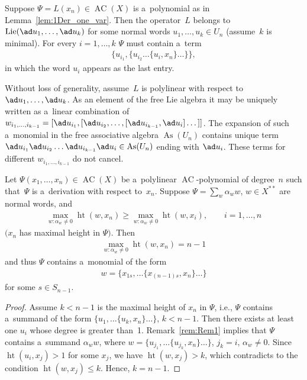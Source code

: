 \begin{remark}
\label{rem:Rem1}
Suppose $\Psi=L(x_n)\in \operatorname{AC}(X) $ is a~polynomial as in Lemma~\ref{lem:1Der_one_var}.
Then the operator~$L$ belongs to $\operatorname{Lie}(\ad u_1,\dots, \ad u_k)$ for some normal words $u_1,\dots, u_k
\in U_n$ (assume~$k$ is minimal).
For every $i=1,\dots, k$ $\Psi $ must contain a~term
\begin{gather*}
\{u_{i_1},\{u_{i_2} \dots\{u_{i},x_n\}\dots \}\},
\end{gather*}
in which the word $u_i$ appears as the last entry.
\end{remark}

Without loss of generality, assume~$L$ is polylinear with respect to $\ad u_1, \dots, \ad u_k$.
As an element of the free Lie algebra it may be uniquely written as a~linear combination of $w_{i_1,\dots, i_{k-1}} =
[\ad u_{i_1}, [\ad u_{i_2}, \dots, [\ad u_{i_{k-1}}, \ad u_i]\dots]]$.
The expansion of such a~monomial in the free associative algebra $\operatorname{As}(U_n)$ contains unique term $\ad u_{i_1}
\ad u_{i_2} \dots \ad u_{i_{k-1}} \ad u_i\in \operatorname{As}(U_n)$ ending with $\ad u_i$.
These terms for dif\/ferent $w_{i_1,\dots, i_{k-1}}$ do not cancel.

\begin{corollary}
\label{cor:ACformDer}
Let $\Psi(x_1,\dots, x_n) \in \operatorname{AC}(X)$ be a~polylinear $\operatorname{AC}$-poly\-no\-mi\-al of degree~$n$ such that~$\Psi $ is a~derivation
with respect to~$x_n$.
Suppose $\Psi = \sum\limits_{w} \alpha_w w$, $w\in X^{**}$ are normal words, and
\begin{gather*}
\max\limits_{w:\alpha_w\ne 0} \operatorname{ht}(w,x_n)\ge \max\limits_{w:\alpha_w\ne 0} \operatorname{ht}(w,x_i),
\qquad
i=1,\dots, n
\end{gather*}
$(x_n$ has maximal height in $\Psi)$.
Then
\begin{gather*}
\max\limits_{w:\alpha_w\ne 0} \operatorname{ht}(w,x_n) = n-1
\end{gather*}
and thus $\Psi $ contains a~monomial of the form
\begin{gather*}
w = \{x_{1s}, \dots \{x_{(n-1)s}, x_n\}\dots \}
\end{gather*}
for some $s\in S_{n-1}$.
\end{corollary}

\begin{proof}
Assume $k<n-1$ is the maximal height of $x_n$ in $\Psi $, i.e., $\Psi $ contains a~summand of the form $\{u_{1}, \dots
\{u_{k},x_n\}\dots \}$, $k<n-1$.
Then there exists at least one $u_i$ whose degree is greater than~1.
Remark~\ref{rem:Rem1} implies that $\Psi $ contains a~summand $\alpha_w w$, where $w = \{u_{j_1},\dots\{u_{j_k},x_n\}\dots \}$, $j_k=i$,
$\alpha_w\ne 0$.
Since $\operatorname{ht}(u_i,x_j)>1$ for some $x_j$, we have $\operatorname{ht}(w,x_j)>k$, which contradicts to the condition $\operatorname{ht}(w,x_j)\le k$.
Hence, $k=n-1$.
\end{proof}

